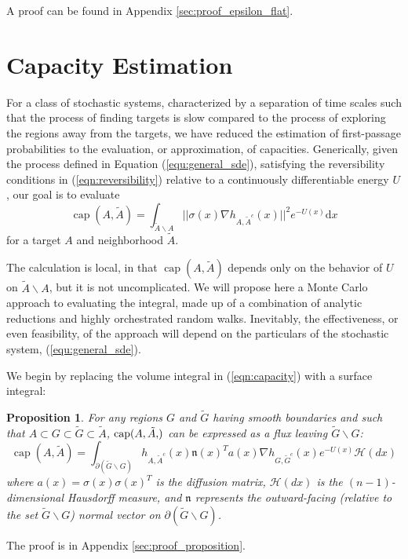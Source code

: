\documentclass[12pt, nofootinbib,english, amsmath, amssymb, aps, priprint, graphicx,floatfix]{revtex4-1}
\newtheorem{proposition}{Proposition}
\theoremstyle{plain}
\theoremstyle{definition}
\theoremstyle{plain}
\newcommand{\normal}{{\mathfrak{n}}}
\newcommand{\capac}[2]{\ensuremath{\operatorname{cap}}(#1,#2)}
\newcommand{\hausdorffmeasure}{\mathscr{H}(dx)}
\newcommand{\tA}{{\tilde A}}
\begin{document}
A proof can be found in Appendix \ref{sec:proof_epsilon_flat}.

\section{Capacity Estimation} 
\label{sec:Estimation}
For a class of stochastic systems, characterized by a separation of time scales such that the process of finding targets is slow compared to the process of exploring the regions away from the targets, we have reduced the estimation of first-passage probabilities to the evaluation, or approximation, of capacities.
Generically, given the process defined in Equation (\ref{equ:general_sde}), satisfying the reversibility conditions in (\ref{eqn:reversibility}) relative to a continuously differentiable energy $U$, our goal is to evaluate
\begin{equation}
\label{eqn:capacity}
\ensuremath{\operatorname{cap}} (A, \tilde{A}) = \int_{\tilde A \backslash A}
||\sigma(x) \nabla h_{A, \tilde{A}^c}(x)||^2 e^{- U(x)} \mathrm{d} x 
\end{equation}
for a target $A$ and neighborhood $\tA$.

The calculation is local, in that $\capac{A}{\tilde{A}}$ depends only on the behavior of  $U$ on $\tA\backslash A$, but it is not uncomplicated. We will propose here a Monte Carlo approach to evaluating the integral, made up of a combination of analytic reductions and highly orchestrated random walks. Inevitably, the effectiveness, or even feasibility, of the approach will depend on the particulars of the stochastic system, (\ref{equ:general_sde}).

We begin by replacing the volume integral in (\ref{eqn:capacity}) with a surface integral:

\begin{proposition}
\label{prop:flux}
For any regions $G$ and $\tilde{G}$ having smooth boundaries and such that $A\subset G \subset \tilde G \subset \tilde A$, $\capac{A,\tA}$ can be expressed as a flux leaving $\tilde G \backslash G$:
\begin{equation}
\label{eqn:GIntegral}
\ensuremath{\operatorname{cap}} (A, \tilde{A}) = \int_{\partial (\tilde G \backslash G)}  h_{A, \tilde{A}^c} (x)   \normal(x)^T a (x) \nabla h_{G, \tilde{G}^c} (x)e^{- U (x)} \hausdorffmeasure
\end{equation}
where $a(x)=\sigma(x)\sigma(x)^T$ is the diffusion matrix, $\hausdorffmeasure$ is the $(n-1)$-dimensional Hausdorff measure, and $\normal$ represents the outward-facing (relative to the set $\tilde G \backslash G$) normal vector on $\partial (\tilde G \backslash G)$.
\end{proposition}
\noindent The proof is in Appendix \ref{sec:proof_proposition}.
\end{document}

